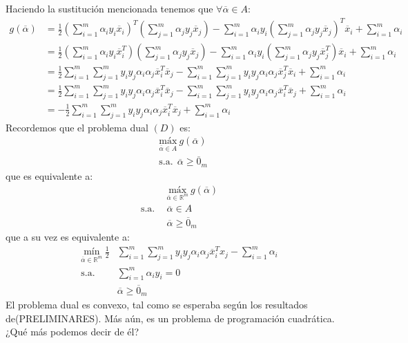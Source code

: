 \documentclass[11pt]{article}
\newcommand{\R}{\mathbb{R}}
\newcommand{\Rm}{\R^{m}}
\newcommand{\av}{\overline{\alpha}}
\newcommand{\x}{\overline{x}}
\newcommand{\zm}{\overline{0}_{m}}
\newcommand{\ali}{\alpha_{i}}
\newcommand{\alj}{\alpha_{j}}
\begin{document}
Haciendo la sustitución mencionada tenemos que $\forall\av\in A$:
\begin{equation*}
\begin{aligned}
g(\av)&=\frac{1}{2}\left(\sum_{i=1}^{m}\ali y_{i}\x_{i}\right)^{T}\left(\sum_{j=1}^{m}\alj y_{j}\x_{j}\right)-\sum_{i=1}^{m}\ali y_{i}\left(\sum_{j=1}^{m}\alj y_{j}\x_{j}\right)^{T}\x_{i} +\sum_{i=1}^{m}\ali\\
&=\frac{1}{2}\left(\sum_{i=1}^{m}\ali y_{i}\x_{i}^{T}\right)\left(\sum_{j=1}^{m}\alj y_{j}\x_{j}\right)-\sum_{i=1}^{m}\ali y_{i}\left(\sum_{j=1}^{m}\alj y_{j}\x_{j}^{T}\right)\x_{i} +\sum_{i=1}^{m}\ali\\
&=\frac{1}{2}\sum_{i=1}^{m}\sum_{j=1}^{m}y_{i}y_{j}\ali\alj\x_{i}^{T}\x_{j}-\sum_{i=1}^{m}\sum_{j=1}^{m}y_{i}y_{j}\ali\alj\x_{j}^{T}\x_{i}+\sum_{i=1}^{m}\ali\\
&=\frac{1}{2}\sum_{i=1}^{m}\sum_{j=1}^{m}y_{i}y_{j}\ali\alj\x_{i}^{T}\x_{j}-\sum_{i=1}^{m}\sum_{j=1}^{m}y_{i}y_{j}\ali\alj\x_{i}^{T}\x_{j}+\sum_{i=1}^{m}\ali\\
&=-\frac{1}{2}\sum_{i=1}^{m}\sum_{j=1}^{m}y_{i}y_{j}\ali\alj\x_{i}^{T}\x_{j}+\sum_{i=1}^{m}\ali
\end{aligned}
\end{equation*}
Recordemos que el problema dual $(D)$ es:
\begin{equation*}
\begin{aligned}
& \underset{\av\in A}{\text{máx}}\ g(\av) \\
& \text{s.a.}\ \ \av\geq\zm
\end{aligned}
\end{equation*}
que es equivalente a:
\begin{equation*}
\begin{aligned}
& \underset{\av\in\Rm}{\text{máx}}\ g(\av) \\
\text{s.a.}\ \
& \av\in A \\
& \av\geq\zm
\end{aligned}
\end{equation*}
que a su vez es equivalente a:
\begin{equation*}
\begin{aligned}
 \underset{\av\in\Rm}{\text{mín}}\ \frac{1}{2}&\sum_{i=1}^{m}\sum_{j=1}^{m}y_{i}y_{j}\ali\alj\x_{i}^{T}x_{j}-\sum_{i=1}^{m}\ali \\
\text{s.a.}\ \
& \sum_{i=1}^{m}\ali y_{i}=0\\
& \av\geq\zm
\end{aligned}
\end{equation*}
El problema dual es convexo, tal como se esperaba según los resultados de(PRELIMINARES). Más aún, es un problema de programación cuadrática. ¿Qué más podemos decir de él?\\
\end{document}
